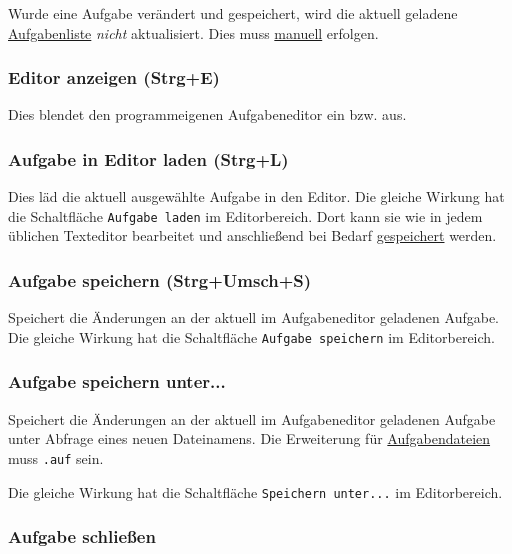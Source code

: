 \documentclass[a4paper,DIV=11
]{scrartcl}
\begin{document}
Wurde eine Aufgabe verändert und gespeichert, wird die aktuell geladene
\protect\hyperlink{aufgabenlisten}{Aufgabenliste} \emph{nicht}
aktualisiert. Dies muss
\protect\hyperlink{AufgabenlisteNeuLaden}{manuell} erfolgen.

\hypertarget{editor-anzeigen-strge}{%
\subsubsection{Editor anzeigen (Strg+E)}\label{editor-anzeigen-strge}}

Dies blendet den programmeigenen Aufgabeneditor ein bzw. aus.

\hypertarget{aufgabe-in-editor-laden-strgl}{%
\subsubsection{Aufgabe in Editor laden
(Strg+L)}\label{aufgabe-in-editor-laden-strgl}}

Dies läd die aktuell ausgewählte Aufgabe in den Editor. Die gleiche
Wirkung hat die Schaltfläche \texttt{Aufgabe\ laden} im Editorbereich.
Dort kann sie wie in jedem üblichen Texteditor bearbeitet und
anschließend bei Bedarf
\protect\hyperlink{AufgabeSpeichern}{gespeichert} werden.

\hypertarget{aufgabe-speichern-strgumschs}{%
\subsubsection{Aufgabe speichern
(Strg+Umsch+S)}\label{aufgabe-speichern-strgumschs}}

Speichert die Änderungen an der aktuell im Aufgabeneditor geladenen
Aufgabe. Die gleiche Wirkung hat die Schaltfläche
\texttt{Aufgabe\ speichern} im Editorbereich.

\hypertarget{aufgabe-speichern-unter}{%
\subsubsection{Aufgabe speichern
unter...}\label{aufgabe-speichern-unter}}

Speichert die Änderungen an der aktuell im Aufgabeneditor geladenen
Aufgabe unter Abfrage eines neuen Dateinamens. Die Erweiterung für
\protect\hyperlink{aufgabendateien}{Aufgabendateien} muss \texttt{.auf}
sein.

Die gleiche Wirkung hat die Schaltfläche \texttt{Speichern\ unter...} im
Editorbereich.

\hypertarget{aufgabe-schlieuxdfen}{%
\subsubsection{Aufgabe schließen}\label{aufgabe-schlieuxdfen}}
\end{document}
